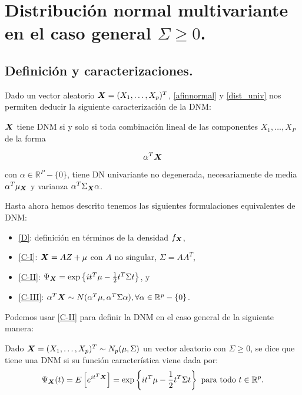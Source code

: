 \section{Distribución normal multivariante en el caso general $\Sigma \ge 0$.}

\subsection{Definición y caracterizaciones.}
Dado un vector aleatorio $\boldsymbol{X} = (X_1,\dots,X_p)^T$, \ref{afinnormal} y \ref{dist_univ} nos permiten deducir la siguiente caracterización de la DNM:

\begin{nprop} \label{posvar:car-iii}
  $\boldsymbol{X}$ tiene DNM si y solo si toda combinación lineal de las componentes $X_1,\dots,X_P$ de la forma

  \[
     \alpha^T \boldsymbol{X}
  \]

  con $\alpha\in \mathbb R^P -\{0\}$, tiene DN univariante no degenerada, necesariamente de media $\alpha^T \mu_{\boldsymbol{X}}$
  y varianza $\alpha^T \Sigma_{\boldsymbol{X}} \alpha$.
\end{nprop}


Hasta ahora hemos descrito tenemos las siguientes formulaciones equivalentes de DNM:
\begin{itemize}
\item \hyperref[posvar:defnormal]{[D]}: definición en términos de la densidad $f_{\boldsymbol{X}}$,
\item \hyperref[posvar:car-i]{[C-I]}: $\boldsymbol{X} = AZ + \mu$ con $A$ no singular, $\Sigma = AA^T$,
\item \hyperref[posvar:car-ii]{[C-II]}: $\Psi_{\boldsymbol{X}} = \exp\left\{it^T\mu - \frac{1}{2}t^T \Sigma t\right\}$, y
\item \hyperref[posvar:car-iii]{[C-III]}: $\alpha^T \boldsymbol{X} \sim N(\alpha^T \mu, \alpha^T \Sigma \alpha), \forall \alpha \in \mathbb R^p - \{0\}$.
\end{itemize}


Podemos usar \hyperref[posvar:car-ii]{[C-II]} para definir la DNM en el caso general de la siguiente manera:

\begin{ndef} \label{general:car-ii}
  Dado $\boldsymbol{X} = (X_1,\dots,X_p)^T \sim N_p(\mu,\Sigma)$ un vector aleatorio con $\Sigma \geq 0$, se dice que tiene una DNM si su función característica viene dada por:
  \[
    \Psi_{\boldsymbol{X}}(t) = E\left[e^{it^T \boldsymbol{X}}\right] = \exp\left\{it^T \mu - \frac{1}{2}t^T \Sigma t\right\} \text{ para todo } t \in \mathbb R^p.
  \]

\end{ndef}

